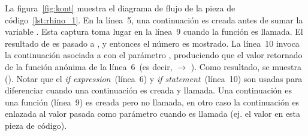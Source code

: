 \documentclass[conference]{IEEEtran}
\begin{document}
La figura~\ref{fig:kont} muestra el diagrama de flujo de la pieza de c\'odigo~\ref{lst:rhino_1}. En la l\'inea~5, una continuaci\'on  es creada antes de sumar la variable . Esta captura toma lugar en la l\'inea~9 cuando la funci\'on  es llamada. El resultado de  es pasado a , y entonces el n\'umero  es mostrado. La l\'inea~10 invoca la continuaci\'on asociada a  con el par\'ametro , produciendo que el valor retornado de la funci\'on an\'onima de la l\'inea~6~(es decir,  $\rightarrow$ ).  Como resultado, se muestra  (). Notar que el {\em if expression}~(l\'inea~6) y {\em if statement}~(l\'inea~10) son usadas para diferenciar cuando una continuaci\'on es creada y llamada. Una continuaci\'on es una funci\'on (l\'inea~9) es creada pero no llamada, en otro caso la continuaci\'on es enlazada al valor pasada como par\'ametro cuando es llamada (ej. el valor  en esta pieza de c\'odigo).         



%
%
%
\end{document}
